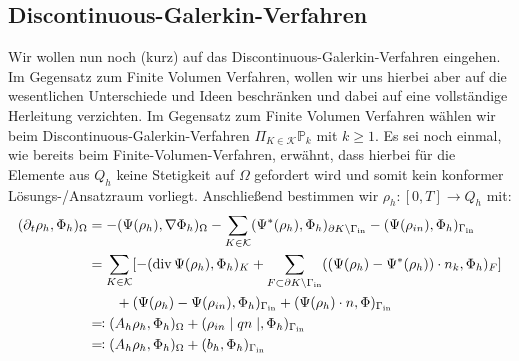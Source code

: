 \subsection{Discontinuous-Galerkin-Verfahren}
Wir wollen nun noch (kurz) auf das Discontinuous-Galerkin-Verfahren eingehen. Im Gegensatz zum Finite Volumen Verfahren, wollen wir uns hierbei aber auf die wesentlichen Unterschiede und Ideen beschränken und dabei auf eine vollständige Herleitung verzichten. \newline
Im Gegensatz zum Finite Volumen Verfahren wählen wir beim Discontinuous-Galerkin-Verfahren $\Pi_{K\in\mathcal{K}} \mathbb{P}_k $ mit $ k \geq 1 $. Es sei noch einmal, wie bereits beim Finite-Volumen-Verfahren, erwähnt, dass hierbei für die Elemente aus $Q_h$ keine Stetigkeit auf $\Omega$ gefordert wird und somit kein konformer Lösungs-/Ansatzraum vorliegt. \newline
Anschließend bestimmen wir $\rho_h : [0,T] \rightarrow Q_h$ mit:
	\begin{align*}
		(\partial_t \rho_h , \Phi_h)_{\Omega} &= -(\Psi(\rho_h),\nabla \Phi_h)_{\Omega}
		- \sum_{K \in \mathcal{K}}(\Psi^*(\rho_h),\Phi_h)_{\partial K \setminus \Gamma_{{\text{in}}}}
		-(\Psi(\rho_{in}),\Phi_h)_{\Gamma_{{\text{in}}}} \\
		&= \sum_{K \in \mathcal{K}} [ -( \operatorname{div} \Psi (\rho_h),\Phi_h)_{K}
		+ \sum_{ F \subset \partial K \setminus \Gamma_{{\text{in}}}} ((\Psi(\rho_h)-\Psi ^* (\rho_h)) \cdot n_k , \Phi_h)_F ] \\		
		&\qquad +(\Psi(\rho_h) - \Psi(\rho_{in}),\Phi_h)_{\Gamma_{{\text{in}}}} 
		+ ( \Psi(\rho_h) \cdot n , \Phi )_{ \Gamma_{{\text{in}}} } \\
		&\eqqcolon  (A_h \rho_h, \Phi_h )_{\Omega} + (\rho_{in} \mid qn \mid ,\Phi_h)_{\Gamma_{{\text{in}}}} \\
		&\eqqcolon (A_h \rho_h, \Phi_h )_{\Omega} + (b_h,\Phi_h)_{\Gamma_{{\text{in}}}}
	\end{align*}  
